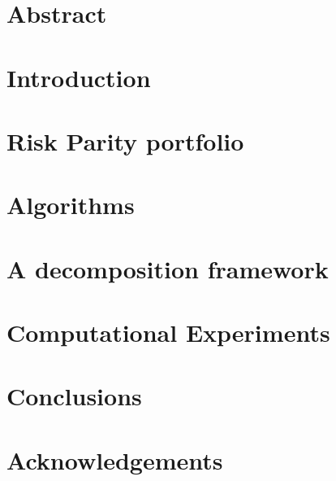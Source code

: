 \documentclass[10pt, titlepage]{book}
\numberwithin{equation}{section}
\begin{document}
\begin{titlepage}

\end{titlepage} 
\thispagestyle{empty}
\chapter*{Abstract}
\thispagestyle{empty}


\tableofcontents\clearpage

\chapter{Introduction}


\chapter{Risk Parity portfolio}


\chapter{Algorithms}


\chapter{A decomposition framework}


\chapter{Computational Experiments}


\chapter{Conclusions}


\chapter{Acknowledgements}
\clearpage

\begin{thebibliography}{9}

\end{thebibliography}
%
\end{document}
